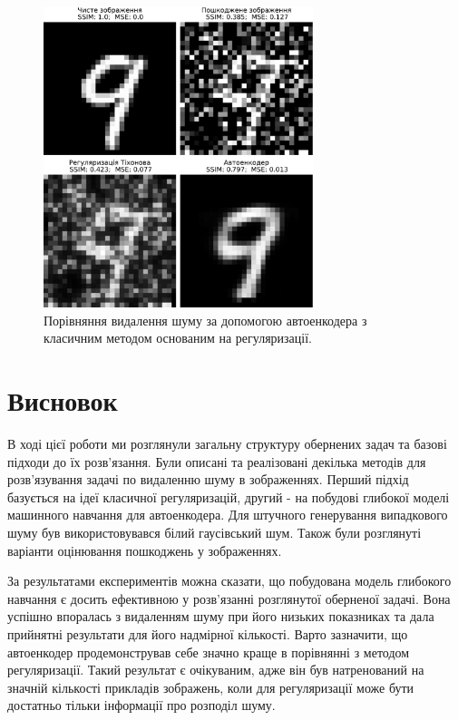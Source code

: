 \documentclass[14pt,a4paper]{extarticle}
\newcounter{e}
\numberwithin{equation}{section}
\numberwithin{figure}{section}
\begin{document}
	\begin{figure}[H]
		\centering
		\includegraphics[width=0.7\textwidth]{../resources/denoising-methods-comparation.pdf}
		\caption{Порівняння видалення шуму за допомогою автоенкодера з класичним методом основаним на регуляризації.}
		\label{fig:denoising-methods-comparation}
	\end{figure}

	\newpage
	\thispagestyle{empty}
	\section*{Висновок}
	\begin{center}\end{center}
	В ході цієї роботи ми розглянули загальну структуру обернених задач та базові підходи до їх розв'язання. Були описані та реалізовані декілька методів для розв'язування задачі по видаленню шуму в зображеннях. Перший підхід базується на ідеї класичної регуляризацій, другий - на побудові глибокої моделі машинного навчання для автоенкодера. Для штучного генерування випадкового шуму був використовувався білий гаусівський шум. Також були розглянуті варіанти оцінювання пошкоджень у зображеннях.

	За результатами експериментів можна сказати, що побудована модель глибокого навчання є досить ефективною у розв'язанні розглянутої оберненої задачі. Вона успішно впоралась з видаленням шуму при його низьких показниках та дала прийнятні результати для його надмірної кількості. Варто зазначити, що автоенкодер продемонстрував себе значно краще в порівнянні з методом регуляризації. Такий результат є очікуваним, адже він був натренований на значній кількості прикладів зображень, коли для регуляризації може бути достатньо тільки інформації про розподіл шуму.
	
\end{document}
